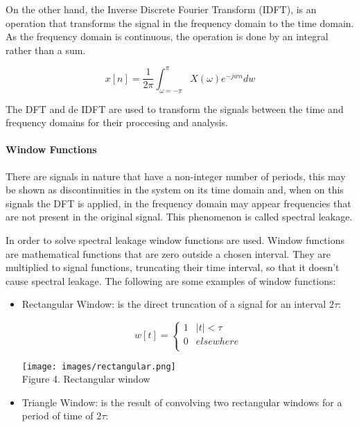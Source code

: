 {{{{{On the other hand, the Inverse Discrete Fourier Transform (IDFT), is an operation that transforms the signal in the frequency domain to the time domain. As the frequency domain is continuous, the operation is done by an integral rather than a sum.

$$ x[n]= \frac{1}{2\pi}\int_{\omega = - \pi}^{\pi} X(\omega)e^{-jwn} dw$$

The DFT and de IDFT are used to transform the signals between the time and frequency domains for their proccesing and analysis.

\paragraph{Window Functions}
 There are signals in nature that have a non-integer number of periods, this may be shown as discontinuities in the system on its time domain and, when on this signals the DFT is applied, in the frequency domain may appear frequencies that are not present in the original signal. This phenomenon is called spectral leakage. 

 In order to solve spectral leakage window functions are used. Window functions are mathematical functions that are zero outside a chosen interval. They are multiplied to signal functions, truncating their time interval, so that it doesn't cause spectral leakage.  The following are some examples of window functions:
\begin{itemize}
    \item Rectangular Window: is the direct truncation of a signal for an interval $2\tau$:

        \begin{equation*}
          w[t]=
        \begin{cases}
          1  &|t| < \tau \\
          0  &elsewhere \\
        \end{cases}
      \end{equation*}
  
 
         \begin{center}
         \texttt{[image: images/rectangular.png]} \\
         Figure 4. Rectangular window
         \end{center}

    \item Triangle Window: is the result of convolving two rectangular windows for a period of time of $2\tau$:
  

\end{itemize}}}}}}
